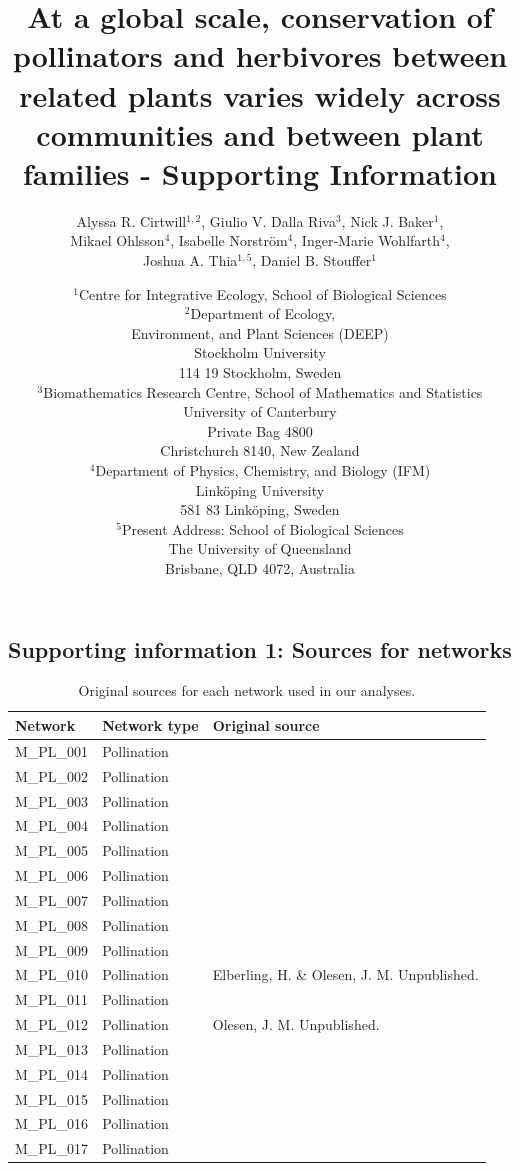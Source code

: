 \documentclass[12pt]{article}
\title{At a global scale, conservation of pollinators and herbivores between related plants varies widely across communities and between plant families - Supporting Information}
\author{Alyssa R. Cirtwill$^{1,2}$, Giulio V. Dalla Riva$^{3}$, Nick J. Baker$^{1}$,\\
Mikael Ohlsson$^{4}$, Isabelle Norstr\"{o}m$^{4}$, Inger-Marie Wohlfarth$^{4}$,\\
Joshua A. Thia$^{1,5}$, 
Daniel B. Stouffer$^{1}$}
\date{\small$^1$Centre for Integrative Ecology, School of Biological Sciences\\
\medskip$^2$Department of Ecology,\\
Environment, and Plant Sciences (DEEP)\\
Stockholm University\\
114 19 Stockholm, Sweden\\
\medskip$^3$Biomathematics Research Centre, School of Mathematics and Statistics\\
University of Canterbury\\Private Bag 4800\\
Christchurch 8140, New Zealand\\
\medskip$^4$Department of Physics, Chemistry, and Biology (IFM)\\ Link\"{o}ping University\\ 581 83 Link\"{o}ping, Sweden\\
\medskip$^5$Present Address: School of Biological Sciences\\
The University of Queensland\\Brisbane, QLD 4072, Australia }
\newcommand{\beginsupplement}{%
        \setcounter{table}{0}
        \renewcommand{\thetable}{S\arabic{table}}%
        \setcounter{figure}{0}
        \renewcommand{\thefigure}{S\arabic{figure}}%
     }
\begin{document}
\maketitle
\baselineskip=8.5mm
\begin{spacing}{1.5}

\linenumbers
\beginsupplement
\clearpage

\section*{Supporting information 1: Sources for networks}
  \begin{table}[!h]
    \caption{Original sources for each network used in our analyses.}
    \label{sources}
    \begin{center}
    \begin{tabular}{|l l m{10cm} |}
    \hline
    Network & Network type & Original source \\
    \hline
    M\_PL\_001  & Pollination & \citep{Arroyo1982}  \\
    M\_PL\_002  & Pollination & \citep{Arroyo1982}  \\
    M\_PL\_003  & Pollination & \citep{Arroyo1982}  \\
    M\_PL\_004  & Pollination & \citep{Barrett1987} \\
    M\_PL\_005  & Pollination & \citep{Clements1923}  \\
    M\_PL\_006  & Pollination & \citep{Dicks2002} \\
    M\_PL\_007  & Pollination & \citep{Dicks2002} \\
    M\_PL\_008  & Pollination & \citep{Dupont2003}  \\
    M\_PL\_009  & Pollination & \citep{Elberling1999} \\
    M\_PL\_010  & Pollination & Elberling, H. \& Olesen, J. M. Unpublished. \\
    M\_PL\_011  & Pollination & \citep{Olesen2002a}  \\
    M\_PL\_012  & Pollination & Olesen, J. M. Unpublished.  \\
    M\_PL\_013  & Pollination & \citep{Ollerton2003}  \\
    M\_PL\_014  & Pollination & \citep{Hocking1968} \\
    M\_PL\_015  & Pollination & \citep{Petanidou1991} \\
    M\_PL\_016  & Pollination & \citep{Herrera1988} \\
    M\_PL\_017  & Pollination & \citep{Memmott2002} \\

\end{tabular}
\end{center}
\end{table}
\end{spacing}
\end{document}
